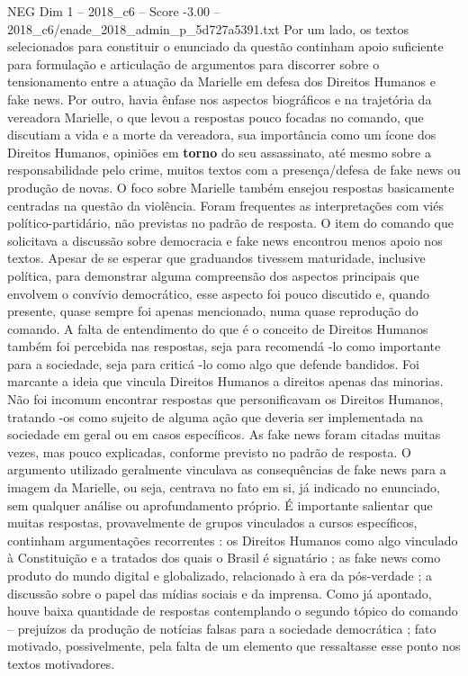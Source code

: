 \begin{textsample}{NEG Dim 1 – 2018\_c6 – Score -3.00 – 2018\_c6/enade\_2018\_admin\_p\_5d727a5391.txt}
Por um lado, os textos selecionados para constituir o enunciado da questão continham apoio suficiente para formulação e articulação de argumentos para discorrer sobre o tensionamento entre a atuação da Marielle em defesa dos Direitos Humanos e fake news.
Por outro, havia ênfase nos aspectos biográficos e na trajetória da vereadora Marielle, o que levou a respostas pouco focadas no comando, que discutiam a vida e a morte da vereadora, sua importância como um ícone dos Direitos Humanos, opiniões em \textbf{torno} do seu assassinato, até mesmo sobre a responsabilidade pelo crime, muitos textos com a presença/defesa de fake news ou produção de novas.
O foco sobre Marielle também ensejou respostas basicamente centradas na questão da violência.
Foram frequentes as interpretações com viés político-partidário, não previstas no padrão de resposta.
O item do comando que solicitava a discussão sobre democracia e fake news encontrou menos apoio nos textos.
Apesar de se esperar que graduandos tivessem maturidade, inclusive política, para demonstrar alguma compreensão dos aspectos principais que envolvem o convívio democrático, esse aspecto foi pouco discutido e, quando presente, quase sempre foi apenas mencionado, numa quase reprodução do comando.
A falta de entendimento do que é o conceito de Direitos Humanos também foi percebida nas respostas, seja para recomendá -lo como importante para a sociedade, seja para criticá -lo como algo que defende bandidos.
Foi marcante a ideia que vincula Direitos Humanos a direitos apenas das minorias.
Não foi incomum encontrar respostas que personificavam os Direitos Humanos, tratando -os como sujeito de alguma ação que deveria ser implementada na sociedade em geral ou em casos específicos.
As fake news foram citadas muitas vezes, mas pouco explicadas, conforme previsto no padrão de resposta.
O argumento utilizado geralmente vinculava as consequências de fake news para a imagem da Marielle, ou seja, centrava no fato em si, já indicado no enunciado, sem qualquer análise ou aprofundamento próprio.
É importante salientar que muitas respostas, provavelmente de grupos vinculados a cursos específicos, continham argumentações recorrentes : os Direitos Humanos como algo vinculado à Constituição e a tratados dos quais o Brasil é signatário ; as fake news como produto do mundo digital e globalizado, relacionado à era da pós-verdade ; a discussão sobre o papel das mídias sociais e da imprensa.
Como já apontado, houve baixa quantidade de respostas contemplando o segundo tópico do comando – prejuízos da produção de notícias falsas para a sociedade democrática ; fato motivado, possivelmente, pela falta de um elemento que ressaltasse esse ponto nos textos motivadores.

\end{textsample}
